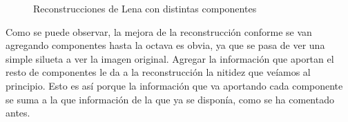 \begin{figure}[]
 \centering
 \caption{Reconstrucciones de Lena con distintas componentes}
 \label{f:RLenaC4}
\end{figure}

Como se puede observar, la mejora de la reconstrucción conforme se van agregando componentes hasta la octava es obvia, ya que se pasa de ver una simple silueta a ver la imagen original. Agregar la información que aportan el resto de componentes le da a la reconstrucción la nitidez que veíamos al principio. Esto es así porque la información que va aportando cada componente se suma a la que información de la que ya se disponía, como se ha comentado antes.\\ %


